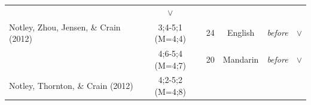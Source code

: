 \documentclass[oneside]{report}
\theoremstyle{definition}
\theoremstyle{definition}
\theoremstyle{definition}
\theoremstyle{remark}
\begin{document}
\begin{longtable}[]{@{}lccclc@{}}
\begin{minipage}[t]{0.25\columnwidth}
\end{minipage} & \begin{minipage}[t]{0.13\columnwidth}\centering\strut
\(\lor\)\strut
\end{minipage}\tabularnewline
\begin{minipage}[t]{0.23\columnwidth}\raggedright\strut
Notley, Zhou, Jensen, \& Crain (2012)\strut
\end{minipage} & \begin{minipage}[t]{0.07\columnwidth}\centering\strut
3;4-5;1 (M=4;4)\strut
\end{minipage} & \begin{minipage}[t]{0.05\columnwidth}\centering\strut
24\strut
\end{minipage} & \begin{minipage}[t]{0.10\columnwidth}\centering\strut
English\strut
\end{minipage} & \begin{minipage}[t]{0.25\columnwidth}\raggedright\strut
\emph{before}\strut
\end{minipage} & \begin{minipage}[t]{0.13\columnwidth}\centering\strut
\(\lor\)\strut
\end{minipage}\tabularnewline
\begin{minipage}[t]{0.23\columnwidth}\raggedright\strut
\strut
\end{minipage} & \begin{minipage}[t]{0.07\columnwidth}\centering\strut
4;6-5;4 (M=4;7)\strut
\end{minipage} & \begin{minipage}[t]{0.05\columnwidth}\centering\strut
20\strut
\end{minipage} & \begin{minipage}[t]{0.10\columnwidth}\centering\strut
Mandarin\strut
\end{minipage} & \begin{minipage}[t]{0.25\columnwidth}\raggedright\strut
\emph{before}\strut
\end{minipage} & \begin{minipage}[t]{0.13\columnwidth}\centering\strut
\(\lor\)\strut
\end{minipage}\tabularnewline
\begin{minipage}[t]{0.23\columnwidth}\raggedright\strut
Notley, Thornton, \& Crain (2012)\strut
\end{minipage} & \begin{minipage}[t]{0.07\columnwidth}\centering\strut
4;2-5;2 (M=4;8)\strut

\end{minipage}
\end{longtable}
\end{document}
